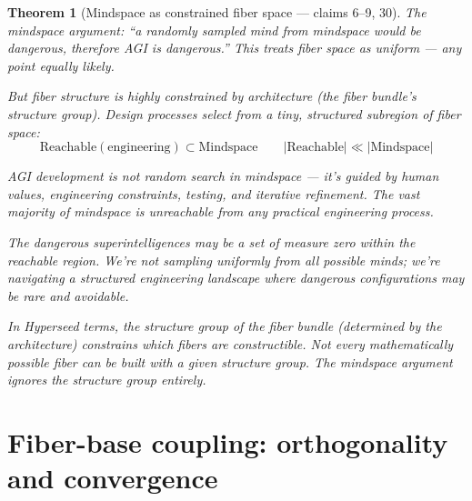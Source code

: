 \documentclass[11pt,a4paper]{article}
\newtheorem{theorem}[definition]{Theorem}
\begin{document}
\begin{theorem}[Mindspace as constrained fiber space --- claims 6--9, 30]
\label{thm:mindspace}
The mindspace argument: ``a randomly sampled mind from mindspace would be
dangerous, therefore AGI is dangerous.'' This treats fiber space as
uniform --- any point equally likely.

But fiber structure is highly constrained by architecture (the fiber
bundle's structure group). Design processes select from a tiny, structured
subregion of fiber space:
\[
  \text{Reachable}(\text{engineering}) \subset \text{Mindspace}
  \qquad |\text{Reachable}| \ll |\text{Mindspace}|
\]

AGI development is not random search in mindspace --- it's guided by
human values, engineering constraints, testing, and iterative refinement.
The vast majority of mindspace is unreachable from any practical
engineering process.

The dangerous superintelligences may be a set of measure zero within the
reachable region. We're not sampling uniformly from all possible minds;
we're navigating a structured engineering landscape where dangerous
configurations may be rare and avoidable.

In Hyperseed terms, the structure group of the fiber bundle (determined
by the architecture) constrains which fibers are constructible. Not every
mathematically possible fiber can be built with a given structure group.
The mindspace argument ignores the structure group entirely.
\end{theorem}

\section{Fiber-base coupling: orthogonality and convergence}
\label{sec:coupling}
\end{document}
